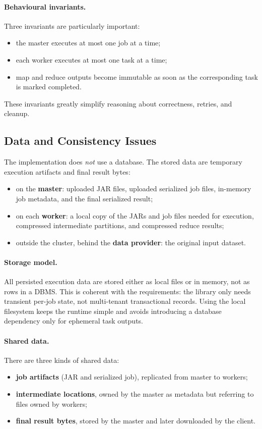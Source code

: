 \documentclass{scrartcl}
\begin{document}
\paragraph{Behavioural invariants.}
Three invariants are particularly important:
%
\begin{itemize}
    \item the master executes at most one job at a time;
    \item each worker executes at most one task at a time;
    \item map and reduce outputs become immutable as soon as the corresponding task is marked completed.
\end{itemize}

These invariants greatly simplify reasoning about correctness, retries, and cleanup.

\subsection{Data and Consistency Issues}\label{data-and-consistency-issues}
The implementation does \emph{not} use a database. The stored data are temporary execution artifacts and final result bytes:
%
\begin{itemize}
    \item on the \textbf{master}: uploaded JAR files, uploaded serialized job files, in-memory job metadata, and the final serialized result;
    \item on each \textbf{worker}: a local copy of the JARs and job files needed for execution, compressed intermediate partitions, and compressed reduce results;
    \item outside the cluster, behind the \textbf{data provider}: the original input dataset.
\end{itemize}

\paragraph{Storage model.}
All persisted execution data are stored either as local files or in memory, not as rows in a DBMS. This is coherent with the requirements: the library only needs transient per-job state, not multi-tenant transactional records. Using the local filesystem keeps the runtime simple and avoids introducing a database dependency only for ephemeral task outputs.

\paragraph{Shared data.}
There are three kinds of shared data:
%
\begin{itemize}
    \item \textbf{job artifacts} (JAR and serialized job), replicated from master to workers;
    \item \textbf{intermediate locations}, owned by the master as metadata but referring to files owned by workers;
    \item \textbf{final result bytes}, stored by the master and later downloaded by the client.
\end{itemize}
\end{document}

